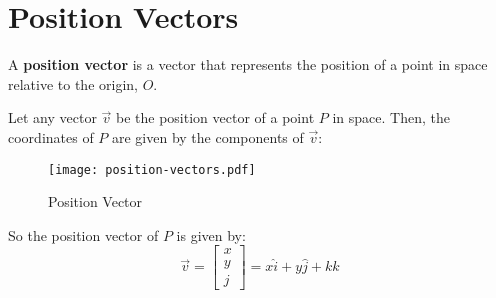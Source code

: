 \section{Position Vectors}

\begin{definition}
  A {\bf position vector} is a vector that represents the position of a point in space relative to the origin, $O$. 
\end{definition}

Let any vector $\vec{v}$ be the position vector of a point $P$ in space. Then, the coordinates of $P$ are given by the components of $\vec{v}$:
\begin{figure}[H]
\centering
   \texttt{[image: position-vectors.pdf]}
   \caption{Position Vector}
   \label{fig:figure-4-position-vector}
\end{figure}

So the position vector of $P$ is given by:
\begin{equation}
  \vec{v} = \begin{bmatrix} x \\ y \\ j \end{bmatrix}  =x\hat{i} + y\hat{j} + k\hat{k}
\end{equation}
\clearpage
